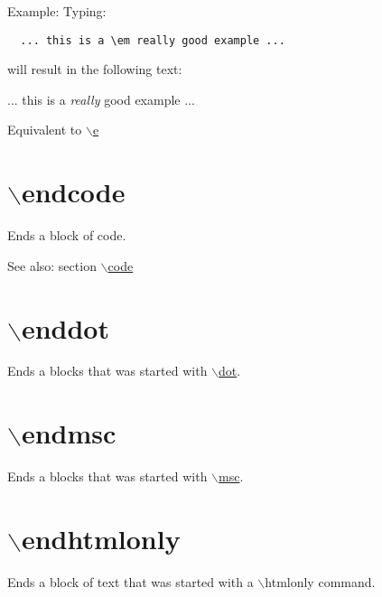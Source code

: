 \begin{Desc}
\item[Example:]Typing: 

\footnotesize\begin{verbatim}
  ... this is a \em really good example ... 
  \end{verbatim}
\normalsize
 will result in the following text:\par
\par
 ... this is a {\em really\/} good example ...\end{Desc}
Equivalent to \hyperlink{commands_cmde}{$\backslash$e}



 \hypertarget{commands_cmdendcode}{}\section{$\backslash$endcode}\label{commands_cmdendcode}
 Ends a block of code. \begin{Desc}
\item[See also:]section \hyperlink{commands_cmdcode}{$\backslash$code}\end{Desc}


 \hypertarget{commands_cmdenddot}{}\section{$\backslash$enddot}\label{commands_cmdenddot}
 Ends a blocks that was started with \hyperlink{commands_cmddot}{$\backslash$dot}.



 \hypertarget{commands_cmdendmsc}{}\section{$\backslash$endmsc}\label{commands_cmdendmsc}
 Ends a blocks that was started with \hyperlink{commands_cmdmsc}{$\backslash$msc}.



 \hypertarget{commands_cmdendhtmlonly}{}\section{$\backslash$endhtmlonly}\label{commands_cmdendhtmlonly}
 Ends a block of text that was started with a $\backslash$htmlonly command.

